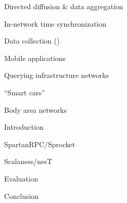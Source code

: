 \begin{citemize}
  \item Directed diffusion \& data aggregation
  \item In-network time synchronization
  \item Data collection ()
  \item Mobile applications
  \begin{citemize}
    \item Querying infrastructure networks
    \item ``Smart cars''
    \item Body area networks
  \end{citemize}
\end{citemize}
\stopslide



\begin{cenumerate}
\item Introduction
\item {}
\item SpartanRPC/Sprocket
\item Scalaness/nesT
\item Evaluation
\item Conclusion
\end{cenumerate}
\stopslide



